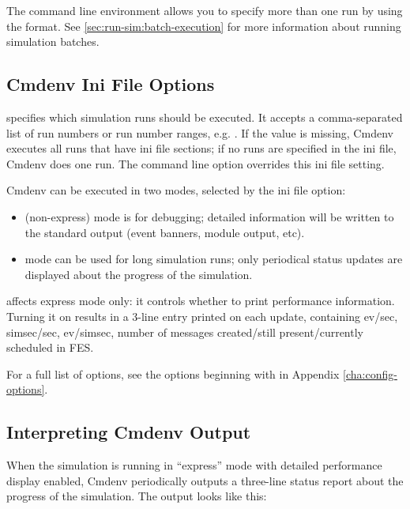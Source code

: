 The command line environment allows you to specify more than one run by
using the  format. See \ref{sec:run-sim:batch-execution}
for more information about running simulation batches.

\subsection{Cmdenv Ini File Options}
\label{sec:run-sim:cmdenv-section}

 specifies which simulation runs should be executed.
It accepts a comma-separated list of run numbers or run number ranges, e.g.
. If the value is missing, Cmdenv executes all runs that have
ini file sections; if no runs are specified in the ini file, Cmdenv does one run.
The  command line option overrides this ini file setting.


Cmdenv can be executed in two modes, selected by the 
ini file option:

\begin{itemize}
    \item {} (non-express) mode is for debugging; detailed information
        will be written to the standard output (event banners, module output,
        etc).
    \item {} mode can be used for long simulation runs; only
        periodical status updates are displayed about the progress of the
        simulation.
\end{itemize}

 affects express mode only: it controls
whether to print performance information. Turning it on results in a 3-line
entry printed on each update, containing ev/sec, simsec/sec, ev/simsec,
number of messages created/still present/currently scheduled in FES.

For a full list of options, see the options beginning with  in
Appendix \ref{cha:config-options}.


\subsection{Interpreting Cmdenv Output}
\label{sec:run-sim:interpreting-cmdenv-output}

When the simulation is running in ``express'' mode with detailed
performance display enabled, Cmdenv periodically outputs a three-line
status report about the progress of the simulation.
The output looks like this:

